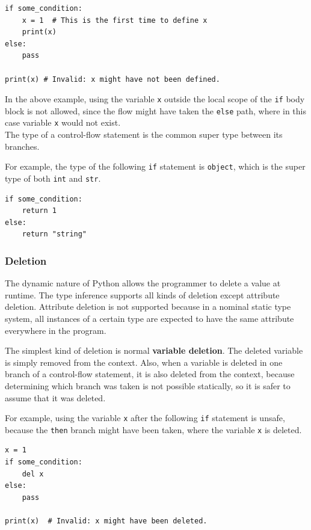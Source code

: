 \begin{lstlisting}
if some_condition:
	x = 1  # This is the first time to define x
	print(x)
else:
	pass
	
print(x) # Invalid: x might have not been defined.
\end{lstlisting}

In the above example, using the variable \lstinline|x| outside the local scope of the \lstinline|if| body block is not allowed, since the flow might have taken the \lstinline|else| path, where in this case variable \lstinline|x| would not exist. \\

The type of a control-flow statement is the common super type between its branches.

For example, the type of the following \lstinline|if| statement is \lstinline|object|, which is the super type of both \lstinline|int| and \lstinline|str|.

\begin{lstlisting}
if some_condition:
	return 1
else:
	return "string"
\end{lstlisting}


\subsubsection{Deletion}
The dynamic nature of Python allows the programmer to delete a value at runtime. The type inference supports all kinds of deletion except attribute deletion. Attribute deletion is not supported because in a nominal static type system, all instances of a certain type are expected to have the same attribute everywhere in the program.

The simplest kind of deletion is normal \textbf{variable deletion}. The deleted variable is simply removed from the context. Also, when a variable is deleted in one branch of a control-flow statement, it is also deleted from the context, because determining which branch was taken is not possible statically, so it is safer to assume that it was deleted.

For example, using the variable \lstinline|x| after the following \lstinline|if| statement is unsafe, because the \lstinline|then| branch might have been taken, where the variable \lstinline|x| is deleted.
\begin{lstlisting}
x = 1
if some_condition:
	del x
else:
	pass
	
print(x)  # Invalid: x might have been deleted.
\end{lstlisting}

